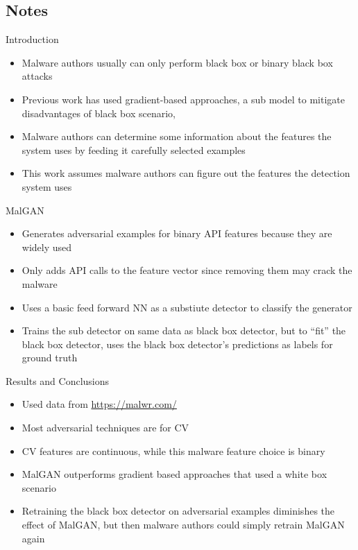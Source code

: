\documentclass{article}
\begin{document}
\subsection*{Notes}

Introduction
\begin{itemize}
\item Malware authors usually can only perform black box or binary black box attacks
\item Previous work has used gradient-based approaches, a sub model to mitigate disadvantages of black box scenario, 
\item Malware authors can determine some information about the features the system uses by feeding it carefully selected examples
\item This work assumes malware authors can figure out the features the detection system uses
\end{itemize}
MalGAN
\begin{itemize}
\item Generates adversarial examples for binary API features because they are widely used
\item Only adds API calls to the feature vector since removing them may crack the malware
\item Uses a basic feed forward NN as a substiute detector to classify the generator
\item Trains the sub detector on same data as black box detector, but to ``fit'' the black box detector, uses the black box detector's predictions as labels for ground truth
\end{itemize}
Results and Conclusions
\begin{itemize}
\item Used data from \url{https://malwr.com/}
\item Most adversarial techniques are for CV
\item CV features are continuous, while this malware feature choice is binary
\item MalGAN outperforms gradient based approaches that used a white box scenario
\item Retraining the black box detector on adversarial examples diminishes the effect of MalGAN, but then malware authors could simply retrain MalGAN again
\end{itemize}

\pagebreak

\end{document}
